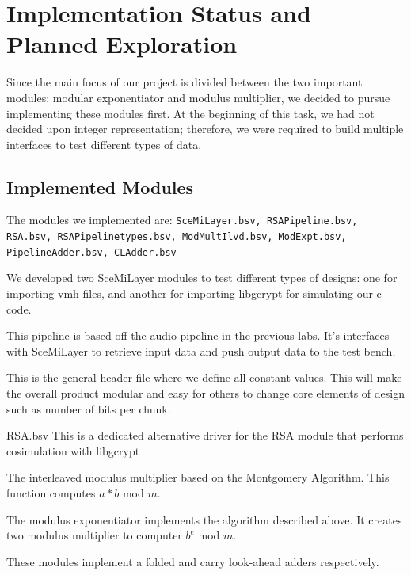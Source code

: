 \documentclass[12pt]{article}
\begin{document}
\section{Implementation Status and Planned Exploration}
Since the main focus of our project is divided between the two important modules: modular exponentiator and modulus multiplier, we decided to pursue implementing these modules first.  At the beginning of this task, we had not decided upon integer representation; therefore, we were required to build multiple interfaces to test different types of data.  \\


\subsection{Implemented Modules}
The modules we implemented are:  {\tt SceMiLayer.bsv, RSAPipeline.bsv, RSA.bsv, RSAPipelinetypes.bsv,  ModMultIlvd.bsv, ModExpt.bsv, PipelineAdder.bsv, CLAdder.bsv}

\begin{description}
  \item[SceMiLayer.bsv] We developed two SceMiLayer modules to test different types of designs: one for importing vmh files, and another for importing libgcrypt for simulating our c code.  
  \item[RSAPipeline.bsv] This pipeline is based off the audio pipeline in the previous labs.  It's interfaces with SceMiLayer to retrieve input data and push output data to the test bench.
  \item[RSAPipelinetypes.bsv] This is the general header file where we define all constant values.  This will make the overall product modular and easy for others to change core elements of design such as number of bits per chunk.
  \item{RSA.bsv} This is a dedicated alternative driver for the RSA module that performs cosimulation with libgcrypt
  \item[ModMultIlvd.bsv] The interleaved modulus multiplier based on the Montgomery Algorithm.  This function computes $a*b$ mod $m$.
  \item[ModExpt.bsv] The modulus exponentiator implements the algorithm described above.  It creates two modulus multiplier to computer $b^e$ mod $m$.
  \item[PipelineAdder, CLAdder.bsv] These modules implement a folded and carry look-ahead adders respectively. 
\end{description}
\end{document}
